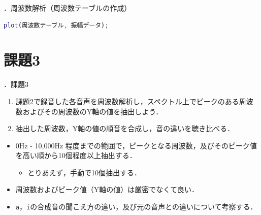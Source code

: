 \documentclass[aspectratio=43]{beamer}
\newcommand{\showsec}{\thesection ．}
\begin{document}
\begin{frame}[t,containsverbatim]{\showsec 周波数解析（周波数テーブルの作成）}
    \begin{lstlisting}[language={Matlab},frame={lines},xleftmargin={0mm}]
plot(周波数テーブル, 振幅データ);
    \end{lstlisting}
    \begin{figure}
        \centering
    \end{figure}
\end{frame}
\section{課題3}
\begin{frame}[t]{\showsec 課題3}
    \begin{exampleblock}{}
        \begin{enumerate}
            \item 課題2で録音した各音声を周波数解析し，スペクトル上でピークのある周波数およびその周波数のY軸の値を抽出しよう．
            \item 抽出した周波数，Y軸の値の順音を合成し，音の違いを聴き比べる．
        \end{enumerate}
    \end{exampleblock}
    \dotfill
    \begin{itemize}
        \item 0Hz - 10,000Hz 程度までの範囲で，ピークとなる周波数，及びそのピーク値を高い順から10個程度以上抽出する．\\
              \begin{itemize}
                  \item とりあえず，手動で10個抽出する．
              \end{itemize}
        \item 周波数およびピーク値（Y軸の値）は厳密でなくて良い．
        \item \texttt{a}，\texttt{i}の合成音の聞こえ方の違い，及び元の音声との違いについて考察する．
    \end{itemize}
\end{frame}
\end{document}
